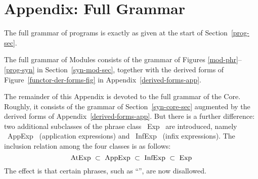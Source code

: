 \section{Appendix: Full Grammar}
\label{core-gram-app}
The full grammar of programs is exactly as given at the start of 
Section~\ref{prog-sec}.

The full grammar of Modules consists of the grammar of 
Figures \ref{mod-phr}--\ref{prog-syn} in Section~\ref{syn-mod-sec},
together with the derived forms of Figure~\ref{functor-der-forms-fig}
in Appendix~\ref{derived-forms-app}.

The remainder of this Appendix is devoted to the full grammar of the
Core. 
Roughly, it consists of the grammar of Section~\ref{syn-core-sec} augmented by
the derived forms of Appendix~\ref{derived-forms-app}.  But there is a further
difference: two additional subclasses of the phrase class ~Exp~ are introduced,
namely ~AppExp~ (application expressions) and ~InfExp~ (infix expressions).
The inclusion relation among the four classes is as follows:
\[ {\rm AtExp}\ \subset\ {\rm AppExp}\
                \subset\ {\rm InfExp}\ \subset\ {\rm Exp} \]
The effect is that certain phrases, such as
``'', are now disallowed.

